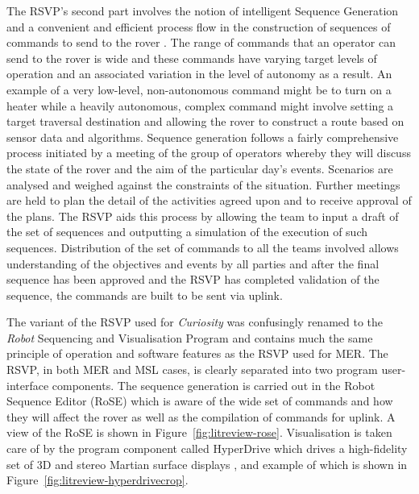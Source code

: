       The RSVP's second part involves the notion of intelligent Sequence Generation and a convenient and efficient process flow in the construction of sequences of commands to send to the rover \cite{1_wright_hartman_cooper_maxwell_yen_morrison_2006}. The range of commands that an operator can send to the rover is wide and these commands have varying target levels of operation and an associated variation in the level of autonomy as a result. An example of a very low-level, non-autonomous command might be to turn on a heater while a heavily autonomous, complex command might involve setting a target traversal destination and allowing the rover to construct a route based on sensor data and algorithms. Sequence generation follows a fairly comprehensive process initiated by a meeting of the group of operators whereby they will discuss the state of the rover and the aim of the particular day's events. Scenarios are analysed and weighed against the constraints of the situation. Further meetings are held to plan the detail of the activities agreed upon and to receive approval of the plans. The RSVP aids this process by allowing the team to input a draft of the set of sequences and outputting a simulation of the execution of such sequences. Distribution of the set of commands to all the teams involved allows understanding of the objectives and events by all parties and after the final sequence has been approved and the RSVP has completed validation of the sequence, the commands are built to be sent via uplink.
      
      The variant of the RSVP used for \textit{Curiosity} was confusingly renamed to the \textit{Robot} Sequencing and Visualisation Program and contains much the same principle of operation and software features as the RSVP used for MER. The RSVP, in both MER and MSL cases, is clearly separated into two program user-interface components. The sequence generation is carried out in the Robot Sequence Editor (RoSE) \cite{soseroverdrivingtools} which is aware of the wide set of commands and how they will affect the rover as well as the compilation of commands for uplink. A view of the RoSE is shown in Figure~\ref{fig:litreview-rose}. Visualisation is taken care of by the program component called HyperDrive which drives a high-fidelity set of 3D and stereo Martian surface displays \cite{nasatechbrief2013rsvp}, and example of which is shown in Figure~\ref{fig:litreview-hyperdrivecrop}.
      

